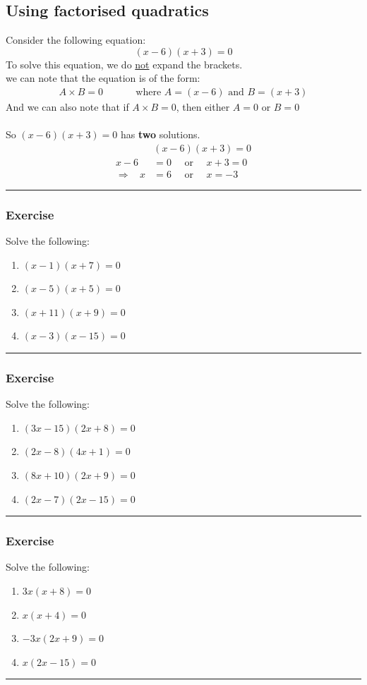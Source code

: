 \documentclass[a4paper,12pt]{article}
\newcommand\question{
	 \rule[0pt]{17cm}{0.5pt}\vspace{-0.5cm}
	\subsubsection{Exercise}

}
\newcommand\questionend{
	\rule[0pt]{17cm}{0.5pt}\vspace{0.0cm}\\
}
\begin{document}
\subsection{Using factorised quadratics}
Consider the following equation: 
$$(x-6)(x+3)=0$$
To solve this equation, we do \underline{not} expand the brackets.\\
we can note that the equation is of the form:
\begin{align*}
	A \times B =0 ~~~~~~~~~~~~~~~ \text{where } A=(x-6) \text{ and } B=(x+3)
\end{align*}
And we can also note that if $A \times B = 0$, then either $A=0$ or $B=0$ \\\\
So $(x-6)(x+3)=0$ has \textbf{two} solutions.
\begin{align*}
	&(x-6)(x+3)=0\\
	x-6& = 0 \text{~~~~or~~~~} x+3=0\\
	\Rightarrow~~~~ x&=6  \text{~~~~or~~~~} x=-3
\end{align*}
\question
Solve the following:
\begin{multicols}{2}
	\begin{enumerate}[label=\normalsize \alph*)~~~]
		\item $(x-1)(x+7)=0$
		\item $(x - 5)(x+ 5)=0$
		\item $(x+11)(x+9)=0$
		\item $(x - 3)(x - 15)=0$
	\end{enumerate}
\end{multicols}
\question
Solve the following:
\begin{multicols}{2}
	\begin{enumerate}[label=\normalsize \alph*)~~~]
		\item $(3x-15)(2x+8)=0$
		\item $(2x - 8)(4x+ 1)=0$
		\item $(8x+10)(2x+9)=0$
		\item $(2x - 7)(2x - 15)=0$
	\end{enumerate}
\end{multicols}
\question
Solve the following:
\begin{multicols}{2}
	\begin{enumerate}[label=\normalsize \alph*)~~~]
		\item $3x(x+8)=0$
		\item $x(x+4)=0$
		\item $-3x(2x+9)=0$
		\item $x(2x - 15)=0$
	\end{enumerate}
\end{multicols}
\questionend
\newpage
\end{document}
